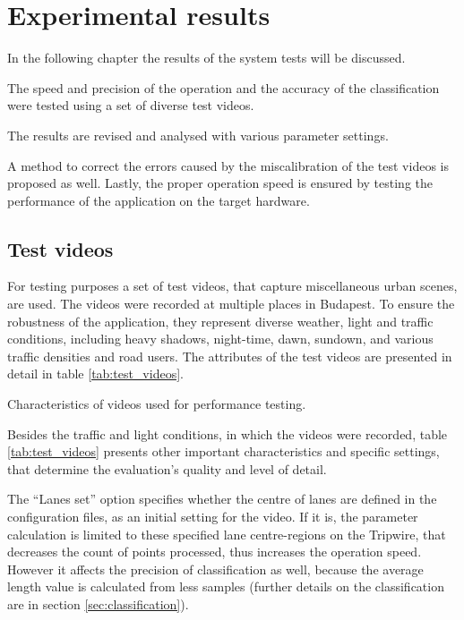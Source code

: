 \chapter{Experimental results}\label{chap:Tests}

In the following chapter the results of the system tests will be discussed. 

The speed and precision of the operation and the accuracy of the classification were tested using a set of diverse test videos.

The results are revised and analysed with various parameter settings.

A method to correct the errors caused by the miscalibration of the test videos is proposed as well.
Lastly, the proper operation speed is ensured by testing the performance of the application on the target hardware.

\section{Test videos}\label{sec:test_videos}
For testing purposes a set of test videos, that capture miscellaneous urban scenes, are used.
The videos were recorded at multiple places in Budapest.
To ensure the robustness of the application, they represent diverse weather, light and traffic conditions, including heavy shadows, night-time, dawn, sundown, and various traffic densities and road users.
The attributes of the test videos are presented in detail in table \ref{tab:test_videos}.

\begin{table}[!b]
	\begin{adjustbox}{center}
	\end{adjustbox}
	\caption{Characteristics of videos used for performance testing.}
	\label{tab:test_videos}
\end{table}

Besides the traffic and light conditions, in which the videos were recorded, table \ref{tab:test_videos} presents other important characteristics and specific settings, that determine the evaluation's quality and level of detail.

The ``Lanes set'' option specifies whether the centre of lanes are defined in the configuration files, as an initial setting for the video.
If it is, the parameter calculation is limited to these specified lane centre-regions on the Tripwire, that decreases the count of points processed, thus increases the operation speed.
However it affects the precision of classification as well, because the average length value is calculated from less samples (further details on the classification are in section \ref{sec:classification}).

